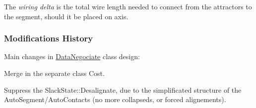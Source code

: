  The {\itshape wiring delta} is the total wire length needed to connect from the attractors to the segment, should it be placed on {\ttfamily axis}.

\hypertarget{classKite_1_1DataNegociate_secDataNegociateModifications}{}\subsubsection{Modifications History}\label{classKite_1_1DataNegociate_secDataNegociateModifications}
Main changes in \hyperlink{classKite_1_1DataNegociate}{Data\-Negociate} class design\-:
\begin{DoxyItemize}
\item Merge in the separate class {\ttfamily Cost}.
\item Suppress the {\ttfamily Slack\-State\-::\-Desalignate}, due to the simplificated structure of the Auto\-Segment/\-Auto\-Contacts (no more collapseds, or forced alignements). 
\end{DoxyItemize}

